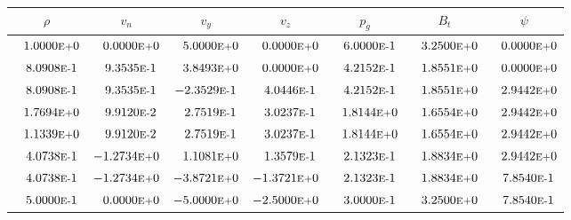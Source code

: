 \begin{tabular*}{\textwidth}{@{\extracolsep{\fill}} ccccccc}
\\ 
\hline 
\hline 
$\rho$ & $v_n$ & $v_y$ & $v_z$ & $p_g$ & $B_t$ & $\psi$ \\ 
\hline 
$\phantom{-} 1.0000\mbox{\sc{e}\smaller{+}}0$ & $\phantom{-} 0.0000\mbox{\sc{e}\smaller{+}}0$ & $\phantom{-} 5.0000\mbox{\sc{e}\smaller{+}}0$ & $\phantom{-} 0.0000\mbox{\sc{e}\smaller{+}}0$ & $\phantom{-} 6.0000\mbox{\sc{e}\smaller{-}}1$ & $\phantom{-} 3.2500\mbox{\sc{e}\smaller{+}}0$ & $\phantom{-} 0.0000\mbox{\sc{e}\smaller{+}}0$ \\ 
$\phantom{-} 8.0908\mbox{\sc{e}\smaller{-}}1$ & $\phantom{-} 9.3535\mbox{\sc{e}\smaller{-}}1$ & $\phantom{-} 3.8493\mbox{\sc{e}\smaller{+}}0$ & $\phantom{-} 0.0000\mbox{\sc{e}\smaller{+}}0$ & $\phantom{-} 4.2152\mbox{\sc{e}\smaller{-}}1$ & $\phantom{-} 1.8551\mbox{\sc{e}\smaller{+}}0$ & $\phantom{-} 0.0000\mbox{\sc{e}\smaller{+}}0$ \\ 
$\phantom{-} 8.0908\mbox{\sc{e}\smaller{-}}1$ & $\phantom{-} 9.3535\mbox{\sc{e}\smaller{-}}1$ & $-2.3529\mbox{\sc{e}\smaller{-}}1$ & $\phantom{-} 4.0446\mbox{\sc{e}\smaller{-}}1$ & $\phantom{-} 4.2152\mbox{\sc{e}\smaller{-}}1$ & $\phantom{-} 1.8551\mbox{\sc{e}\smaller{+}}0$ & $\phantom{-} 2.9442\mbox{\sc{e}\smaller{+}}0$ \\ 
$\phantom{-} 1.7694\mbox{\sc{e}\smaller{+}}0$ & $\phantom{-} 9.9120\mbox{\sc{e}\smaller{-}}2$ & $\phantom{-} 2.7519\mbox{\sc{e}\smaller{-}}1$ & $\phantom{-} 3.0237\mbox{\sc{e}\smaller{-}}1$ & $\phantom{-} 1.8144\mbox{\sc{e}\smaller{+}}0$ & $\phantom{-} 1.6554\mbox{\sc{e}\smaller{+}}0$ & $\phantom{-} 2.9442\mbox{\sc{e}\smaller{+}}0$ \\ 
$\phantom{-} 1.1339\mbox{\sc{e}\smaller{+}}0$ & $\phantom{-} 9.9120\mbox{\sc{e}\smaller{-}}2$ & $\phantom{-} 2.7519\mbox{\sc{e}\smaller{-}}1$ & $\phantom{-} 3.0237\mbox{\sc{e}\smaller{-}}1$ & $\phantom{-} 1.8144\mbox{\sc{e}\smaller{+}}0$ & $\phantom{-} 1.6554\mbox{\sc{e}\smaller{+}}0$ & $\phantom{-} 2.9442\mbox{\sc{e}\smaller{+}}0$ \\ 
$\phantom{-} 4.0738\mbox{\sc{e}\smaller{-}}1$ & $-1.2734\mbox{\sc{e}\smaller{+}}0$ & $\phantom{-} 1.1081\mbox{\sc{e}\smaller{+}}0$ & $\phantom{-} 1.3579\mbox{\sc{e}\smaller{-}}1$ & $\phantom{-} 2.1323\mbox{\sc{e}\smaller{-}}1$ & $\phantom{-} 1.8834\mbox{\sc{e}\smaller{+}}0$ & $\phantom{-} 2.9442\mbox{\sc{e}\smaller{+}}0$ \\ 
$\phantom{-} 4.0738\mbox{\sc{e}\smaller{-}}1$ & $-1.2734\mbox{\sc{e}\smaller{+}}0$ & $-3.8721\mbox{\sc{e}\smaller{+}}0$ & $-1.3721\mbox{\sc{e}\smaller{+}}0$ & $\phantom{-} 2.1323\mbox{\sc{e}\smaller{-}}1$ & $\phantom{-} 1.8834\mbox{\sc{e}\smaller{+}}0$ & $\phantom{-} 7.8540\mbox{\sc{e}\smaller{-}}1$ \\ 
$\phantom{-} 5.0000\mbox{\sc{e}\smaller{-}}1$ & $\phantom{-} 0.0000\mbox{\sc{e}\smaller{+}}0$ & $-5.0000\mbox{\sc{e}\smaller{+}}0$ & $-2.5000\mbox{\sc{e}\smaller{+}}0$ & $\phantom{-} 3.0000\mbox{\sc{e}\smaller{-}}1$ & $\phantom{-} 3.2500\mbox{\sc{e}\smaller{+}}0$ & $\phantom{-} 7.8540\mbox{\sc{e}\smaller{-}}1$ \\ 
\hline 
\end{tabular*} 
